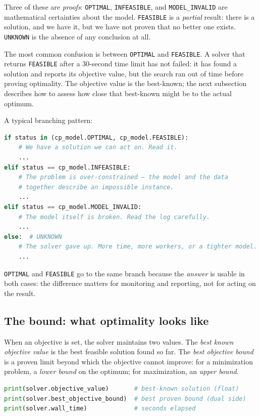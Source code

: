 Three of these are \emph{proofs}: \lstinline!OPTIMAL!,
\lstinline!INFEASIBLE!, and
\lstinline!MODEL_INVALID! are mathematical certainties
about the model. \lstinline!FEASIBLE! is a \emph{partial}
result: there is a solution, and we have it, but we have not proven
that no better one exists. \lstinline!UNKNOWN! is the
absence of any conclusion at all.

The most common confusion is between \lstinline!OPTIMAL!
and \lstinline!FEASIBLE!. A solver that returns
\lstinline!FEASIBLE! after a 30-second time limit has not
failed: it has found a solution and reports its objective value, but
the search ran out of time before proving optimality. The objective
value is the best-known; the next subsection describes how to assess how
close that best-known might be to the actual optimum.

A typical branching pattern:

\begin{lstlisting}[language=Python]
if status in (cp_model.OPTIMAL, cp_model.FEASIBLE):
    # We have a solution we can act on. Read it.
    ...
elif status == cp_model.INFEASIBLE:
    # The problem is over-constrained — the model and the data
    # together describe an impossible instance.
    ...
elif status == cp_model.MODEL_INVALID:
    # The model itself is broken. Read the log carefully.
    ...
else:  # UNKNOWN
    # The solver gave up. More time, more workers, or a tighter model.
    ...
\end{lstlisting}

\lstinline!OPTIMAL! and \lstinline!FEASIBLE!
go to the same branch because the \emph{answer} is usable in both cases:
the difference matters for monitoring and reporting, not for acting
on the result.

\subsection{The bound: what optimality looks like}\label{sec:8.4.3}

When an objective is set, the solver maintains two values. The
\emph{best known objective value} is the best feasible solution found so
far. The \emph{best objective bound} is a proven limit beyond which the
objective cannot improve: for a minimization problem, a \emph{lower
bound} on the optimum; for maximization, an \emph{upper bound}.

\begin{lstlisting}[language=Python]
print(solver.objective_value)       # best-known solution (float)
print(solver.best_objective_bound)  # best proven bound (dual side)
print(solver.wall_time)             # seconds elapsed
\end{lstlisting}

